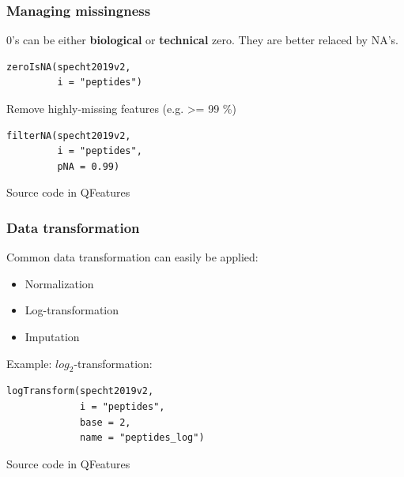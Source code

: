 \documentclass{beamer}
\newcommand{\hcode}[2][lgray]{{\ttfamily\color{vdgray}\colorbox{#1}{#2}}}
\newcommand{\frametitlesection}[1]{\frametitle{\centering #1 \footnotesize \hspace{0pt plus 1 filll} \insertsection}}
\begin{document}
\begin{frame}[fragile]
    \frametitlesection{Managing missingness}
    
    \hcode{0}'s can be either \textbf{biological} or \textbf{technical} zero. 
    They are better relaced by \hcode{NA}'s.
    
    \begin{lstlisting}
zeroIsNA(specht2019v2,
         i = "peptides")
    \end{lstlisting}
    
    Remove highly-missing features (e.g. >= 99 \%)
    
    \begin{lstlisting}
filterNA(specht2019v2, 
         i = "peptides", 
         pNA = 0.99)
    \end{lstlisting}
    
    Source code in \hcode{QFeatures}
    
\end{frame}

\begin{frame}[fragile]
    \frametitlesection{Data transformation}
    
    Common data transformation can easily be applied:
    
    \begin{itemize}
        \item{Normalization}
        \item{Log-transformation}
        \item{Imputation}
    \end{itemize}
    
    Example: $log_2$-transformation:
    
    \begin{lstlisting}
logTransform(specht2019v2, 
             i = "peptides", 
             base = 2,
             name = "peptides_log")
    \end{lstlisting}
    
    Source code in \hcode{QFeatures}
    
\end{frame}
\end{document}
